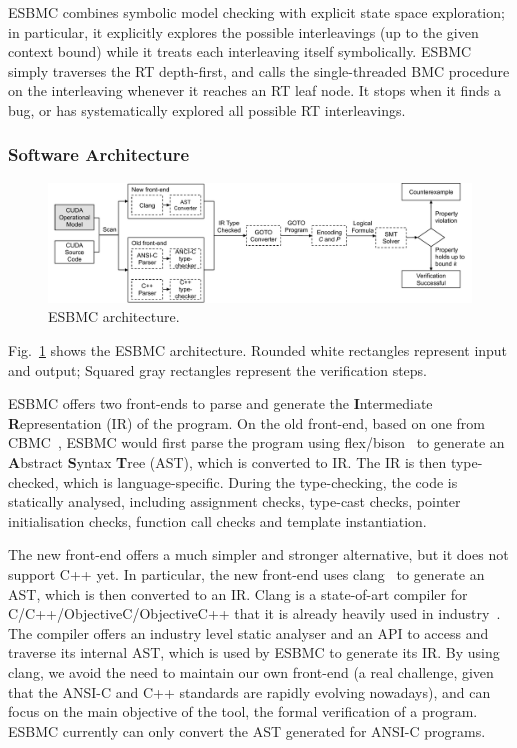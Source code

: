 \documentclass[times, doublespace]{cpeauth}
\begin{document}
ESBMC combines symbolic model checking with explicit state space exploration; in particular, it explicitly explores the possible interleavings (up to the given context bound) while it treats each interleaving itself symbolically. ESBMC simply traverses the RT depth-first, and calls the single-threaded BMC procedure on the interleaving whenever it reaches an RT leaf node. It stops when it finds a bug, or has systematically explored all possible RT interleavings.

\subsubsection{Software Architecture}
\vspace{-2pt}
\label{ssec:SoftwareArchitecture}

\begin{figure}[htb]
\includegraphics[width=\textwidth]{images/esbmc-arch-2}
\caption{ESBMC architecture.}
\label{figure:esbmc-arch}
\end{figure}

Fig.~\ref{figure:esbmc-arch} shows the ESBMC architecture. Rounded white
rectangles represent input and output; Squared gray rectangles represent the
verification steps.

ESBMC offers two front-ends to parse and generate the \textbf{I}ntermediate
\textbf{R}epresentation (IR) of the program. On the old front-end, based on
one from CBMC~\cite{Clarke:2004}, ESBMC would first
parse the program using flex/bison~\cite{Levine:2009:FB:1696439} to generate an
\textbf{A}bstract \textbf{S}yntax \textbf{T}ree (AST), which is converted to IR. The IR is then type-checked,
which is language-specific. During the type-checking, the code is statically
analysed, including assignment checks, type-cast checks, pointer
initialisation checks, function call checks and template instantiation.

The new front-end offers a much simpler and stronger alternative, but it does not support C++ yet. 
In particular, the new front-end uses clang~\cite{Lopes:2014:GSL:2692607} to generate an AST, which is
then converted to an IR. Clang is a state-of-art compiler for
C/C++/ObjectiveC/ObjectiveC++ that it is already heavily used in
industry~\cite{clang-usage}. The compiler offers an industry level static
analyser and an API to access and traverse its internal AST, which is used by
ESBMC to generate its IR. By using clang, we avoid the need to maintain our own
front-end (a real challenge, given that the ANSI-C and C++ standards are rapidly
evolving nowadays), and can focus on the main objective of the tool, the formal
verification of a program. ESBMC currently can only convert the AST generated
for ANSI-C programs.
\end{document}
